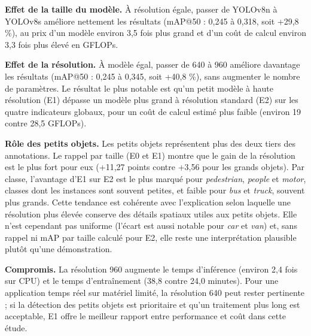 \documentclass[11pt,a4paper]{article}
\begin{document}
\textbf{Effet de la taille du modèle.} À résolution égale, passer de YOLOv8n
à YOLOv8s améliore nettement les résultats (mAP@50 : 0,245 à 0,318, soit
+29,8 \%), au prix d'un modèle environ 3,5 fois plus grand et d'un coût de
calcul environ 3,3 fois plus élevé en GFLOPs.

\textbf{Effet de la résolution.} À modèle égal, passer de 640 à 960 améliore
davantage les résultats (mAP@50 : 0,245 à 0,345, soit +40,8 \%), sans
augmenter le nombre de paramètres. Le résultat le plus notable est qu'un
petit modèle à haute résolution (E1) dépasse un modèle plus grand à
résolution standard (E2) sur les quatre indicateurs globaux, pour un coût de
calcul estimé plus faible (environ 19 contre 28,5 GFLOPs).

\textbf{Rôle des petits objets.} Les petits objets représentent plus des
deux tiers des annotations. Le rappel par taille (E0 et E1) montre que le
gain de la résolution est le plus fort pour eux (+11,27 points contre +3,56
pour les grands objets). Par classe, l'avantage d'E1 sur E2 est le plus
marqué pour \emph{pedestrian}, \emph{people} et \emph{motor}, classes dont
les instances sont souvent petites, et faible pour \emph{bus} et
\emph{truck}, souvent plus grands. Cette tendance est cohérente avec
l'explication selon laquelle une résolution plus élevée conserve des détails
spatiaux utiles aux petits objets. Elle n'est cependant pas uniforme
(l'écart est aussi notable pour \emph{car} et \emph{van}) et, sans rappel ni
mAP par taille calculé pour E2, elle reste une interprétation plausible
plutôt qu'une démonstration.

\textbf{Compromis.} La résolution 960 augmente le temps d'inférence
(environ 2,4 fois sur CPU) et le temps d'entraînement (38,8 contre 24,0
minutes). Pour une application temps réel sur matériel limité, la
résolution 640 peut rester pertinente ; si la détection des petits objets
est prioritaire et qu'un traitement plus long est acceptable, E1 offre le
meilleur rapport entre performance et coût dans cette étude.
\end{document}
